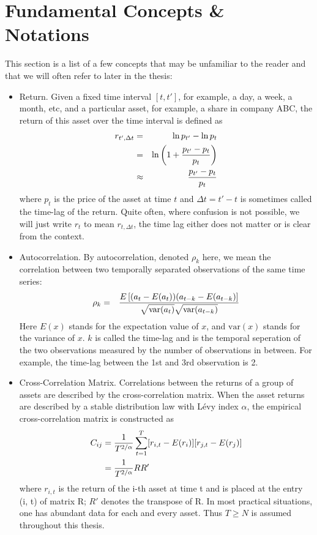 \documentclass{book}
\begin{document}
\section{Fundamental Concepts \& Notations}\label{sec:FundamentalConcepts}
This section is a list of a few concepts that may be unfamiliar to the
reader and that we will often refer to later in the thesis:
\begin{itemize}
\item Return. Given a fixed time interval $[t, t']$, for example, a
  day, a week, a month, etc, and a particular asset, for example, a
  share in company ABC, the return of this asset over the time
  interval is defined as
  \begin{eqnarray*}
    r_{t', \Delta t} &=& \ln p_{t'} - \ln p_t \\
    &=& \ln \left(1 + {p_{t'} - p_t \over p_t}\right) \\
    &\approx& {p_{t'} - p_t \over p_t}
  \end{eqnarray*}
  where $p_t$ is the price of the asset at time $t$ and $\Delta t = t'
  - t$ is sometimes called the time-lag of the return. Quite often,
  where confusion is not possible, we will just write $r_t$ to mean
  $r_{t, \Delta t}$, the time lag either does not matter or is clear
  from the context.

\item Autocorrelation. By autocorrelation, denoted $\rho_k$ here, we
  mean the correlation between two temporally separated observations
  of the same time series:
  \begin{eqnarray*}
    \rho_k &=& {
      E\left[(a_t -E(a_t))(a_{t-k} - E(a_{t-k})\right]
      \over
      \sqrt{\text{var}(a_t)}\sqrt{\text{var}(a_{t-k})}
    }
  \end{eqnarray*}
  Here $E(x)$ stands for the expectation value of $x$, and
  $\text{var}(x)$ stands for the variance of $x$. $k$ is called the
  time-lag and is the temporal seperation of the two observations
  measured by the number of observations in between. For example, the
  time-lag between the 1st and 3rd observation is 2.

\item Cross-Correlation Matrix. Correlations between the returns of a
  group of assets are described by the cross-correlation matrix. When
  the asset returns are described by a stable distribution law with
  L\'evy index $\alpha$, the empirical cross-correlation matrix is
  constructed as
  \begin{equation}
    \label{eq:cross-correlation}
    \begin{aligned}
      C_{ij} &= {1 \over T^{2/\alpha}} \sum_{t=1}^T [r_{i,t}-E(r_i)]
      [r_{j,t}-E(r_j)] \\
      &= {1 \over T^{2/\alpha}} RR'
    \end{aligned}
  \end{equation}
  where $r_{i,t}$ is the return of the i-th asset at time t and is
  placed at the entry (i, t) of matrix R; $R'$ denotes the
  transpose of R. In most practical situations, one has abundant data
  for each and every asset. Thus $T \geq N$ is assumed throughout this
  thesis.


\end{itemize}
\end{document}
